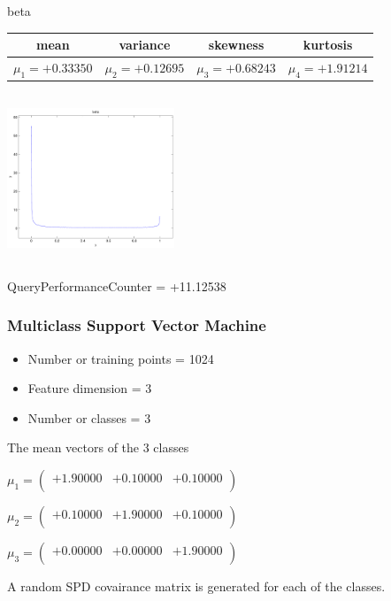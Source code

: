 \documentclass[9pt]{article}
\theoremstyle{plain}
\theoremstyle{definition}
\theoremstyle{remark}
\numberwithin{equation}{section}
\begin{document}
\newpage
beta \begin{tabular}{|c|c|c|c|}  mean & variance & skewness & kurtosis \\  \hline
$\mu_1 = +0.33350$ & $\mu_2 = +0.12695$ & $\mu_3 = +0.68243$ & $\mu_4 =+1.91214$ \\
\end{tabular}

\includegraphics[width=5cm,height=5cm]{beta.pdf}

QueryPerformanceCounter  =  +11.12538
\subsubsection{Multiclass Support Vector Machine }
\begin{itemize}
\item Number or training points = 1024
\item Feature dimension = 3
\item Number or classes = 3
\end{itemize}
{The mean vectors of the 3 classes}

$\mu_1 = \left(
\begin{array}{
ccc}
+1.90000 & +0.10000 & +0.10000 \\
\end{array}
\right)$ \newline 

$\mu_2 = \left(
\begin{array}{
ccc}
+0.10000 & +1.90000 & +0.10000 \\
\end{array}
\right)$ \newline 

$\mu_3 = \left(
\begin{array}{
ccc}
+0.00000 & +0.00000 & +1.90000 \\
\end{array}
\right)$ \newline 

A random SPD covairance matrix is generated for each of the classes.\newline
\end{document}
